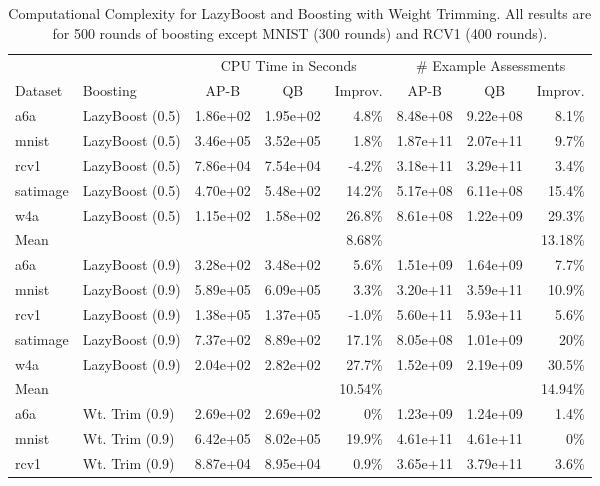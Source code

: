 \begin{table*}[ht]
\caption{Computational Complexity for LazyBoost and Boosting with Weight Trimming.
All results are for 500 rounds of boosting except MNIST (300 rounds) and RCV1 (400 rounds).}
\label{complexity-approx-results}	
\vskip 0.15in
\begin{center}
\begin{small}
\begin{sc}
\begin{tabular}{llccrccr}
\toprule
& & \multicolumn{3}{c}{CPU Time in Seconds} & \multicolumn{3}{c}{\# Example Assessments} \\
Dataset & Boosting & AP-B & QB & Improv. & AP-B & QB & Improv. \\
\midrule
a6a & LazyBoost (0.5) & 1.86e+02 & 1.95e+02 & 4.8\% & 8.48e+08 & 9.22e+08 & 8.1\%  \\
mnist & LazyBoost (0.5)  & 3.46e+05 & 3.52e+05 & 1.8\% & 1.87e+11 & 2.07e+11 & 9.7\% \\
rcv1 & LazyBoost (0.5) & 7.86e+04 & 7.54e+04 & -4.2\% & 3.18e+11 & 3.29e+11 & 3.4\% \\
satimage & LazyBoost (0.5) & 4.70e+02 & 5.48e+02 & 14.2\%  & 5.17e+08 & 6.11e+08 & 15.4\%  \\
w4a & LazyBoost (0.5) & 1.15e+02 & 1.58e+02 & 26.8\% & 8.61e+08 & 1.22e+09 & 29.3\% \\
\midrule
Mean &  & &  & 8.68\% & & & 13.18\% \\
\midrule
a6a & LazyBoost (0.9) & 3.28e+02 & 3.48e+02 & 5.6\%  & 1.51e+09 & 1.64e+09 & 7.7\%  \\
mnist & LazyBoost (0.9) & 5.89e+05 & 6.09e+05 & 3.3\% & 3.20e+11 & 3.59e+11 & 10.9\% \\
rcv1 & LazyBoost (0.9) & 1.38e+05 & 1.37e+05 & -1.0\% & 5.60e+11 & 5.93e+11 & 5.6\% \\
satimage & LazyBoost (0.9) & 7.37e+02 & 8.89e+02 & 17.1\%  & 8.05e+08 & 1.01e+09 & 20\%  \\
w4a & LazyBoost (0.9) & 2.04e+02 & 2.82e+02 & 27.7\% & 1.52e+09 & 2.19e+09 & 30.5\% \\
\midrule
Mean &  & &  & 10.54\% & & & 14.94\% \\
\midrule
a6a & Wt. Trim (0.9) & 2.69e+02 & 2.69e+02 & 0\%  & 1.23e+09 & 1.24e+09 & 1.4\%  \\
mnist & Wt. Trim (0.9) & 6.42e+05 & 8.02e+05 & 19.9\% & 4.61e+11 & 4.61e+11 & 0\% \\
rcv1 & Wt. Trim (0.9) & 8.87e+04 & 8.95e+04 & 0.9\%  & 3.65e+11 & 3.79e+11 & 3.6\% \\

\end{tabular}
\end{sc}
\end{small}
\end{center}
\end{table*}

